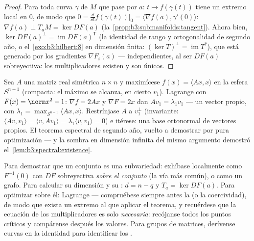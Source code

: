 \begin{proof}
Para toda curva $\gamma$ de $M$ que pase por $a$: $t \mapsto
f(\gamma(t))$ tiene un extremo local en $0$, de modo que $0 =
\frac{\dd}{\dd t}f(\gamma(t))\big|_0 = \langle\nabla f(a),
\gamma'(0)\rangle$: $\nabla f(a) \perp T_aM = \ker DF(a)$
(la~\cref{prop:b3:submanifolds:tangent}). Ahora bien, $\ker DF(a)^\perp
= \operatorname{im}DF(a)^{\mathsf T}$ (la identidad de rango y
ortogonalidad de segundo año, o el~\cref{exo:b3:hilbert:8} en dimensión
finita: $(\ker T)^\perp = \operatorname{im}T^*$), que está generado por
los gradientes $\nabla F_i(a)$ --- independientes, al ser $DF(a)$
sobreyectiva: los multiplicadores existen y son únicos.
\end{proof}

\begin{example}
\label{ex:b3:submanifolds:rayleigh}
Sea $A$ una matriz real simétrica $n\times n$ y maximícese
$f(x) = \langle Ax, x\rangle$ en la esfera $S^{n-1}$
(compacta: el máximo se alcanza, en
cierto $v_1$). Lagrange con $F(x) = \norm x^2 - 1$: $\nabla f = 2Ax$ y
$\nabla F =
2x$ dan $Av_1 = \lambda_1v_1$ --- un vector propio, con
$\lambda_1 = \max_{S^{n-1}}\langle Ax, x\rangle$. Restrínjase $A$ a
$v_1^\perp$ (invariante: $\langle Av, v_1\rangle =
\langle v, Av_1\rangle = \lambda_1\langle v, v_1\rangle = 0$) e itérese:
una base ortonormal de vectores propios. El teorema espectral de segundo
año, vuelto a demostrar por pura optimización --- y la sombra en
dimensión infinita del mismo argumento demostró
el~\cref{lem:b3:spectral:existence}.
\end{example}

\begin{method}\label{met:b3:submanifolds:method}
Para demostrar que un conjunto es una subvariedad: exhíbase localmente
como $F^{-1}(0)$ con $DF$ sobreyectiva \emph{sobre el conjunto} (la vía
más común), o como un grafo. Para calcular su dimensión y su
: $d = n - q$ y
$T_a = \ker DF(a)$. Para optimizar sobre él: Lagrange --- compruébese
siempre antes la  (o la coercividad), de modo que exista un
extremo al que aplicar el teorema, y recuérdese que la ecuación de los
multiplicadores es solo \emph{necesaria}: recójanse todos los puntos
críticos y compárense después los valores. Para grupos de matrices,
derívense curvas en la identidad para identificar los
.
\end{method}

